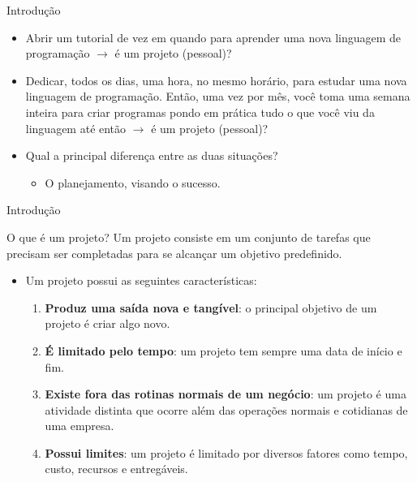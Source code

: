 \documentclass{beamer}
\begin{document}
\begin{frame}{Introdução}
    \begin{itemize}
        \justifying
        \item<1-2> Abrir um tutorial de vez em quando para aprender uma nova linguagem de programação $\rightarrow$ é um projeto (pessoal)? 
        \item<3-4> Dedicar, todos os dias, uma hora, no mesmo horário, para estudar uma nova linguagem de programação. Então, uma vez por mês, você toma uma semana inteira para criar programas pondo em prática tudo o que você viu da linguagem até então $\rightarrow$ é um projeto (pessoal)? 
        \item<5-> Qual a principal diferença entre as duas situações?
            \begin{itemize}
                \item<6> O planejamento, visando o sucesso.
            \end{itemize}
    \end{itemize}
\end{frame}

\begin{frame}{Introdução}
	\begin{block}{O que é um projeto?}
		\justifying
		Um projeto consiste em um conjunto de tarefas que precisam ser completadas para se alcançar um objetivo predefinido.
	\end{block}
	\begin{itemize}
		\justifying
		\item Um projeto possui as seguintes características:
			\begin{enumerate}
				\justifying
				\item<2-> \textbf{Produz uma saída nova e tangível}: o principal objetivo de um projeto é criar algo novo.
				\item<3-> \textbf{É limitado pelo tempo}: um projeto tem sempre uma data de início e fim.
				\item<4-> \textbf{Existe fora das rotinas normais de um negócio}: um projeto é uma atividade distinta que ocorre além das operações normais e cotidianas de uma empresa.
				\item<5> \textbf{Possui limites}: um projeto é limitado por diversos fatores como tempo, custo, recursos e entregáveis.
			\end{enumerate}
	\end{itemize}
\end{frame}
\end{document}
